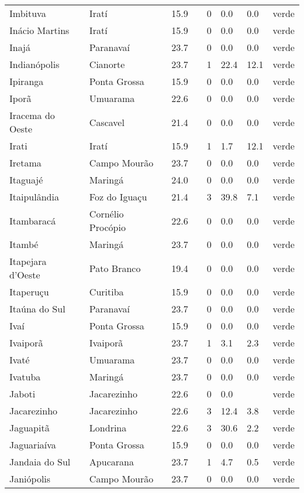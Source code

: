 \begin{longtable}{l|lllllll}
  Imbituva & Iratí & 15.9 &  & 0 & 0.0 & 0.0 & verde \\ 
  Inácio Martins & Iratí & 15.9 &  & 0 & 0.0 & 0.0 & verde \\ 
  Inajá & Paranavaí & 23.7 &  & 0 & 0.0 & 0.0 & verde \\ 
  Indianópolis & Cianorte & 23.7 &  & 1 & 22.4 & 12.1 & verde \\ 
  Ipiranga & Ponta Grossa & 15.9 &  & 0 & 0.0 & 0.0 & verde \\ 
  Iporã & Umuarama & 22.6 &  & 0 & 0.0 & 0.0 & verde \\ 
  Iracema do Oeste & Cascavel & 21.4 &  & 0 & 0.0 & 0.0 & verde \\ 
  Irati & Iratí & 15.9 &  & 1 & 1.7 & 12.1 & verde \\ 
  Iretama & Campo Mourão & 23.7 &  & 0 & 0.0 & 0.0 & verde \\ 
  Itaguajé & Maringá & 24.0 &  & 0 & 0.0 & 0.0 & verde \\ 
  Itaipulândia & Foz do Iguaçu & 21.4 &  & 3 & 39.8 & 7.1 & verde \\ 
  Itambaracá & Cornélio Procópio & 22.6 &  & 0 & 0.0 & 0.0 & verde \\ 
  Itambé & Maringá & 23.7 &  & 0 & 0.0 & 0.0 & verde \\ 
  Itapejara d'Oeste & Pato Branco & 19.4 &  & 0 & 0.0 & 0.0 & verde \\ 
  Itaperuçu & Curitiba & 15.9 &  & 0 & 0.0 & 0.0 & verde \\ 
  Itaúna do Sul & Paranavaí & 23.7 &  & 0 & 0.0 & 0.0 & verde \\ 
  Ivaí & Ponta Grossa & 15.9 &  & 0 & 0.0 & 0.0 & verde \\ 
  Ivaiporã & Ivaiporã & 23.7 &  & 1 & 3.1 & 2.3 & verde \\ 
  Ivaté & Umuarama & 23.7 &  & 0 & 0.0 & 0.0 & verde \\ 
  Ivatuba & Maringá & 23.7 &  & 0 & 0.0 & 0.0 & verde \\ 
  Jaboti & Jacarezinho & 22.6 &  & 0 & 0.0 &  & verde \\ 
  Jacarezinho & Jacarezinho & 22.6 &  & 3 & 12.4 & 3.8 & verde \\ 
  Jaguapitã & Londrina & 22.6 &  & 3 & 30.6 & 2.2 & verde \\ 
  Jaguariaíva & Ponta Grossa & 15.9 &  & 0 & 0.0 & 0.0 & verde \\ 
  Jandaia do Sul & Apucarana & 23.7 &  & 1 & 4.7 & 0.5 & verde \\ 
  Janiópolis & Campo Mourão & 23.7 &  & 0 & 0.0 & 0.0 & verde \\ 

\end{longtable}
